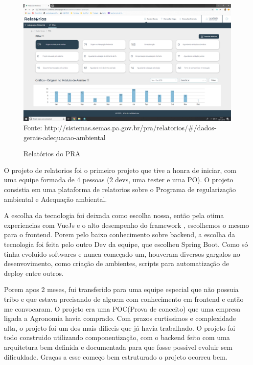 \begin{figure}[H]
\centering
\caption{Relatórios do PRA} %
\includegraphics[scale=0.22]{relatorios-pra}\\  %
{\small Fonte: http://sistemas.semas.pa.gov.br/pra/relatorios/#/dados-gerais-adequacao-ambiental} %
\label{fig:exemplo} %
\end{figure}

O projeto de relatorios foi o primeiro projeto que tive a honra de iniciar, com uma equipe formada de 4 pessoas (2 devs, uma tester e uma PO).
O projeto consistia em uma plataforma de relatorios sobre o Programa de regularização ambiental e Adequação ambiental.

A escolha da tecnologia foi deixada como escolha nossa, então pela otima experiencias com VueJs e o alto desempenho do framework , escolhemos o mesmo para o frontend.
Porem pelo baixo conhecimento sobre backend, a escolha da tecnologia foi feita pelo outro Dev da equipe, que escolheu Spring Boot.
Como só tinha evoluido softwares e nunca começado um, houveram diversos gargalos no desenvovimento, como criação de ambientes, scripts para automatização de deploy entre outros.

Porem apos 2 meses, fui transferido para uma equipe especial que não possuia tribo e que estava precisando de alguem com conhecimento em frontend e então me convocaram.
O projeto era uma POC(Prova de conceito) que uma empresa ligada a Agronomia havia comprado. Com prazos curtissimos e complexidade alta, o projeto foi um dos mais dificeis que já havia trabalhado.
O projeto foi todo construido utilizando componentização, com o backend feito com uma arquitetura bem definida e documentada para que fosse possivel evoluir sem dificuldade. Graças a esse começo bem estruturado o projeto ocorreu bem.

